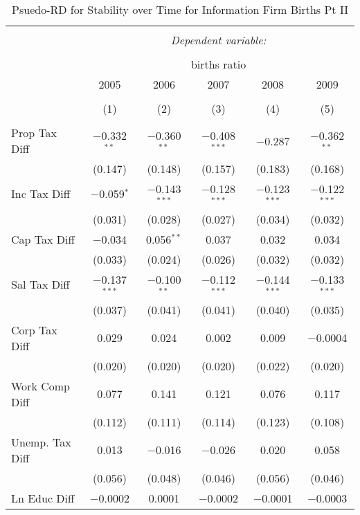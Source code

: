 
\begin{table}[!htbp] \centering 
  \caption{Psuedo-RD for Stability over Time for  Information Firm Births Pt II} 
  \label{51year} 
\small 
\begin{tabular}{@{\extracolsep{5pt}}lccccc} 
\\[-1.8ex]\hline 
\hline \\[-1.8ex] 
 & \multicolumn{5}{c}{\textit{Dependent variable:}} \\ 
\cline{2-6} 
\\[-1.8ex] & \multicolumn{5}{c}{births ratio} \\ 
 & 2005 & 2006 & 2007 & 2008 & 2009 \\ 
\\[-1.8ex] & (1) & (2) & (3) & (4) & (5)\\ 
\hline \\[-1.8ex] 
 Prop Tax Diff & $-$0.332$^{**}$ & $-$0.360$^{**}$ & $-$0.408$^{***}$ & $-$0.287 & $-$0.362$^{**}$ \\ 
  & (0.147) & (0.148) & (0.157) & (0.183) & (0.168) \\ 
  Inc Tax Diff & $-$0.059$^{*}$ & $-$0.143$^{***}$ & $-$0.128$^{***}$ & $-$0.123$^{***}$ & $-$0.122$^{***}$ \\ 
  & (0.031) & (0.028) & (0.027) & (0.034) & (0.032) \\ 
  Cap Tax Diff & $-$0.034 & 0.056$^{**}$ & 0.037 & 0.032 & 0.034 \\ 
  & (0.033) & (0.024) & (0.026) & (0.032) & (0.032) \\ 
  Sal Tax Diff & $-$0.137$^{***}$ & $-$0.100$^{**}$ & $-$0.112$^{***}$ & $-$0.144$^{***}$ & $-$0.133$^{***}$ \\ 
  & (0.037) & (0.041) & (0.041) & (0.040) & (0.035) \\ 
  Corp Tax Diff & 0.029 & 0.024 & 0.002 & 0.009 & $-$0.0004 \\ 
  & (0.020) & (0.020) & (0.020) & (0.022) & (0.020) \\ 
  Work Comp Diff & 0.077 & 0.141 & 0.121 & 0.076 & 0.117 \\ 
  & (0.112) & (0.111) & (0.114) & (0.123) & (0.108) \\ 
  Unemp. Tax Diff & 0.013 & $-$0.016 & $-$0.026 & 0.020 & 0.058 \\ 
  & (0.056) & (0.048) & (0.046) & (0.056) & (0.046) \\ 
  Ln Educ Diff & $-$0.0002 & 0.0001 & $-$0.0002 & $-$0.0001 & $-$0.0003 \\ 

\end{tabular}
\end{table}
